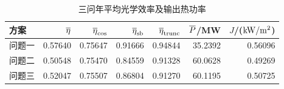 \begin{table}[htbp]
\centering\small
\caption{三问年平均光学效率及输出热功率}\label{tab:annual}
\begin{tabular}{lrrrrrr}
\toprule
方案 & $\overline{\eta}$ & $\overline{\eta}_{\rm cos}$ & $\overline{\eta}_{\rm sb}$ & $\overline{\eta}_{\rm trunc}$ & $\overline{P}$/MW & $J$/($\mathrm{kW}/\mathrm{m}^{2}$)\\\midrule
问题一 & 0.57640 & 0.75647 & 0.91666 & 0.94844 & 35.2392 & 0.56096\\
问题二 & 0.50548 & 0.75470 & 0.84559 & 0.91328 & 60.0628 & 0.49269\\
问题三 & 0.52047 & 0.75507 & 0.86804 & 0.91270 & 60.1195 & 0.50725\\
\bottomrule
\end{tabular}
\end{table}
